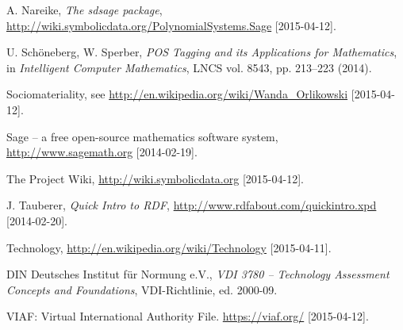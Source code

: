 \documentclass[11pt]{article}
\begin{document}
\begin{thebibliography}{00}
 A. Nareike, \textit{The {\SD} sdsage package},  
  \url{http://wiki.symbolicdata.org/PolynomialSystems.Sage} [2015-04-12].

 U. Sch\"oneberg, W. Sperber, \textit{POS Tagging and its
  Applications for Mathematics}, in \textit{Intelligent Computer Mathematics},
  LNCS vol. 8543, pp. 213--223 (2014).

 Sociomateriality, see 
\url{http://en.wikipedia.org/wiki/Wanda_Orlikowski} [2015-04-12].

 Sage -- a free open-source mathematics software system,
  \newblock \url{http://www.sagemath.org} [2014-02-19].

 The {\SD} Project Wiki, \url{http://wiki.symbolicdata.org}
  [2015-04-12].

 J. Tauberer, \textit{Quick Intro to RDF},
  \url{http://www.rdfabout.com/quickintro.xpd} [2014-02-20].

 Technology,
  \url{http://en.wikipedia.org/wiki/Technology} [2015-04-11].

 DIN Deutsches Institut f{\"u}r Normung e.V.,
  \textit{VDI 3780 -- Technology Assessment Concepts and Foundations},
  VDI-Richtlinie, ed. 2000-09.

 VIAF: Virtual International Authority File.
  \url{https://viaf.org/} [2015-04-12].
\end{thebibliography}
\end{document}
